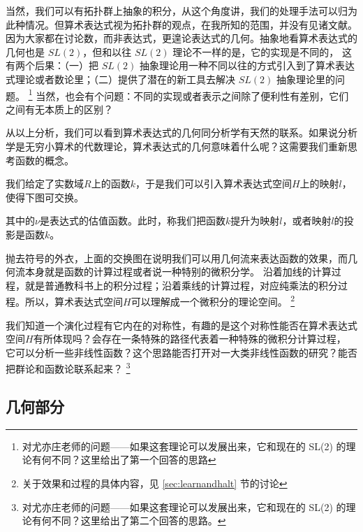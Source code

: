 \documentclass[a4paper,12pt]{article}
\numberwithin{problem}{section}
\numberwithin{definition}{section}
\numberwithin{lemma}{section}
\numberwithin{proposition}{section}
\numberwithin{theorem}{section}
\numberwithin{grammar}{section}
\numberwithin{program}{section}
\numberwithin{convention}{section}
\numberwithin{corollary}{section}
\begin{document}
当然，我们可以有拓扑群上抽象的积分，从这个角度讲，我们的处理手法可以归为此种情况。但算术表达式视为拓扑群的观点，在我所知的范围，并没有见诸文献。
因为大家都在讨论数，而非表达式，更遑论表达式的几何。抽象地看算术表达式的几何也是 $SL(2)$，但和以往 $SL(2)$ 理论不一样的是，它的实现是不同的，
这有两个后果：（一）把 $SL(2)$ 抽象理论用一种不同以往的方式引入到了算术表达式理论或者数论里；（二）提供了潜在的新工具去解决 $SL(2)$ 抽象理论里的问题。
\footnote{对尤亦庄老师的问题——如果这套理论可以发展出来，它和现在的 SL(2) 的理论有何不同？这里给出了第一个回答的思路}
当然，也会有个问题：不同的实现或者表示之间除了便利性有差别，它们之间有无本质上的区别？

从以上分析，我们可以看到算术表达式的几何同分析学有天然的联系。如果说分析学是无穷小算术的代数理论，算术表达式的几何意味着什么呢？这需要我们重新思考函数的概念。

我们给定了实数域$R$上的函数$k$，于是我们可以引入算术表达式空间$H$上的映射$l$，使得下图可交换。

\begin{center}
\end{center}

其中的$\nu$是表达式的估值函数。此时，称我们把函数$k$提升为映射$l$，或者映射$l$的投影是函数$k$。

抛去符号的外衣，上面的交换图在说明我们可以用几何流来表达函数的效果，而几何流本身就是函数的计算过程或者说一种特别的微积分学。
沿着加线的计算过程，就是普通教科书上的积分过程；沿着乘线的计算过程，对应纯乘法的积分过程。所以，算术表达式空间$H$可以理解成一个微积分的理论空间。
\footnote{关于效果和过程的具体内容，见 \ref{sec:learnandhalt} 节的讨论}

我们知道一个演化过程有它内在的对称性，有趣的是这个对称性能否在算术表达式空间$H$有所体现吗？会存在一条特殊的路径代表着一种特殊的微积分计算过程，
它可以分析一些非线性函数？这个思路能否打开对一大类非线性函数的研究？能否把群论和函数论联系起来？
\footnote{对尤亦庄老师的问题——如果这套理论可以发展出来，它和现在的 SL(2) 的理论有何不同？这里给出了第二个回答的思路。}

\subsection{几何部分}
\end{document}

